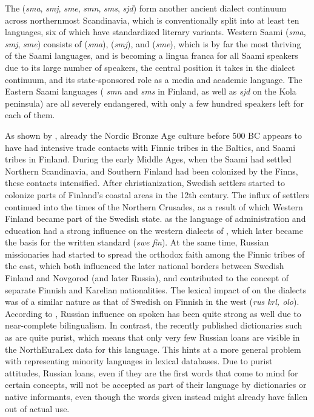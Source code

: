 The  (\textit{sma}, \textit{smj}, \textit{sme}, \textit{smn}, \textit{sms}, \textit{sjd}) form another ancient dialect continuum \citep{sammallahti1998} across northernmost Scandinavia, which is conventionally split into at least ten languages, six of which have standardized literary variants. Western Saami (\textit{sma}, \textit{smj}, \textit{sme}) consists of  (\textit{sma}),  (\textit{smj}), and  (\textit{sme}), which is by far the most thriving of the Saami languages, and is becoming a lingua franca for all Saami speakers due to its large number of speakers, the central position it takes in the dialect continuum, and its state-sponsored role as a media and academic language. The Eastern Saami languages ( \textit{smn} and  \textit{sms} in Finland, as well as  \textit{sjd} on the Kola peninsula) are all severely endangered, with only a few hundred speakers left for each of them.

As shown by \cite{aikio2006contacts}, already the Nordic Bronze Age culture before 500 BC appears to have had intensive trade contacts with Finnic tribes in the Baltics, and Saami tribes in Finland. During the early Middle Ages, when the Saami had settled Northern Scandinavia, and Southern Finland had been colonized by the Finns, these contacts intensified. After christianization, Swedish settlers started to colonize parts of Finland's coastal areas in the 12th century. The influx of settlers continued into the times of the Northern Crusades, as a result of which Western Finland became part of the Swedish state.  as the language of administration and education had a strong influence on the western dialects of , which later became the basis for the written standard (\textit{swe} \arrowLA \textit{fin}). At the same time, Russian missionaries had started to spread the orthodox faith among the Finnic tribes of the east, which both influenced the later national borders between Swedish 
Finland and Novgorod (and later Russia), and contributed to the concept of separate Finnish and Karelian nationalities. The lexical impact of  on the  dialects was of a similar nature as that of Swedish on Finnish in the west (\textit{rus} \arrowLA \textit{krl, olo}). According to \cite{puura_ea_2013}, Russian influence on spoken  has been quite strong as well due to near-complete bilingualism. In contrast, the recently published dictionaries such as \cite{zajceva2010} are quite purist, which means that only very few Russian loans are visible in the NorthEuraLex data for this language. This hints at a more general problem with representing minority languages in lexical databases. Due to purist attitudes, Russian loans, even if they are the first words that come to mind for certain concepts, will not be accepted as part of their language by dictionaries or native informants, even though the words given instead might already have fallen out of actual use.


